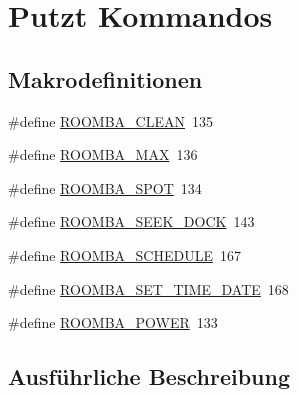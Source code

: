 \hypertarget{group__roomba__commands__clean}{\section{Putzt Kommandos}
\label{group__roomba__commands__clean}
}
\subsection*{Makrodefinitionen}
\begin{DoxyCompactItemize}
\item 
\#define \hyperlink{group__roomba__commands__clean_gad7000006fd0c76b02fe0104236929bc9}{R\-O\-O\-M\-B\-A\-\_\-\-C\-L\-E\-A\-N}~135
\item 
\#define \hyperlink{group__roomba__commands__clean_ga1b7bd60b7ae1d7268b5b9f6313d97968}{R\-O\-O\-M\-B\-A\-\_\-\-M\-A\-X}~136
\item 
\#define \hyperlink{group__roomba__commands__clean_ga320c7d7d833d22b3040f0575f19fd6e3}{R\-O\-O\-M\-B\-A\-\_\-\-S\-P\-O\-T}~134
\item 
\#define \hyperlink{group__roomba__commands__clean_ga72e1f19b34da8d7659728d4b2fb6c8c7}{R\-O\-O\-M\-B\-A\-\_\-\-S\-E\-E\-K\-\_\-\-D\-O\-C\-K}~143
\item 
\#define \hyperlink{group__roomba__commands__clean_gadb4e4068df85b8ae807bd81bba4cd48e}{R\-O\-O\-M\-B\-A\-\_\-\-S\-C\-H\-E\-D\-U\-L\-E}~167
\item 
\#define \hyperlink{group__roomba__commands__clean_gab0a596543df5f5c2dc57dc78fcb11a1d}{R\-O\-O\-M\-B\-A\-\_\-\-S\-E\-T\-\_\-\-T\-I\-M\-E\-\_\-\-D\-A\-T\-E}~168
\item 
\#define \hyperlink{group__roomba__commands__clean_gaf03948b7555c48fca7d01a6bbfb1cc67}{R\-O\-O\-M\-B\-A\-\_\-\-P\-O\-W\-E\-R}~133
\end{DoxyCompactItemize}


\subsection{Ausführliche Beschreibung}


